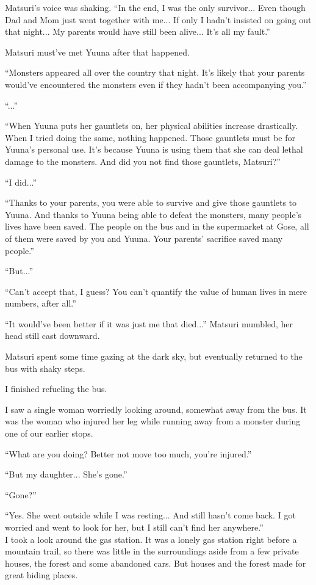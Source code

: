 Matsuri's voice was shaking.  ``In the end, I was the only survivor... Even though Dad and Mom just went together with me... If only I hadn't insisted on going out that night... My parents would have still been alive... It's all my fault.''

Matsuri must've met Yuuna after that happened.

``Monsters appeared all over the country that night. It's likely that your parents would've encountered the monsters even if they hadn't been accompanying you.''

``...''

``When Yuuna puts her gauntlets on, her physical abilities increase drastically. When I tried doing the same, nothing happened. Those gauntlets must be for Yuuna's personal use. It's because Yuuna is using them that she can deal lethal damage to the monsters. And did you not find those gauntlets, Matsuri?''

``I did...''

``Thanks to your parents, you were able to survive and give those gauntlets to Yuuna. And thanks to Yuuna being able to defeat the monsters, many people's lives have been saved. The people on the bus and in the supermarket at Gose, all of them were saved by you and Yuuna. Your parents' sacrifice saved many people.''

``But...''

``Can't accept that, I guess? You can't quantify the value of human lives in mere numbers, after all.''

``It would've been better if it was just me that died...'' Matsuri mumbled, her head still cast downward.

Matsuri spent some time gazing at the dark sky, but eventually returned to the bus with shaky steps.

I finished refueling the bus.

I saw a single woman worriedly looking around, somewhat away from the bus. It was the woman who injured her leg while running away from a monster during one of our earlier stops.

``What are you doing? Better not move too much, you're injured.''

``But my daughter... She's gone.''

``Gone?''

``Yes. She went outside while I was resting... And still hasn't come back. I got worried and went to look for her, but I still can't find her anywhere.'' \\
I took a look around the gas station. It was a lonely gas station right before a mountain trail, so there was little in the surroundings aside from a few private houses, the forest and some abandoned cars. But houses and the forest made for great hiding places.


